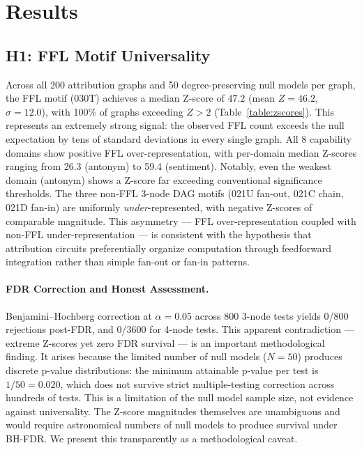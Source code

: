 \section{Results}\label{sec:results}

\subsection{H1: FFL Motif Universality}\label{sec:results_h1}

Across all 200 attribution graphs and 50 degree-preserving null models per graph, the FFL motif (030T) achieves a median Z-score of $47.2$ (mean $Z=46.2$, $\sigma=12.0$), with 100\% of graphs exceeding $Z>2$ (Table~\ref{table:zscores}). This represents an extremely strong signal: the observed FFL count exceeds the null expectation by tens of standard deviations in every single graph. All 8 capability domains show positive FFL over-representation, with per-domain median Z-scores ranging from 26.3 (antonym) to 59.4 (sentiment). Notably, even the weakest domain (antonym) shows a Z-score far exceeding conventional significance thresholds. The three non-FFL 3-node DAG motifs (021U fan-out, 021C chain, 021D fan-in) are uniformly \emph{under}-represented, with negative Z-scores of comparable magnitude. This asymmetry --- FFL over-representation coupled with non-FFL under-representation --- is consistent with the hypothesis that attribution circuits preferentially organize computation through feedforward integration rather than simple fan-out or fan-in patterns.

\paragraph{FDR Correction and Honest Assessment.}
Benjamini--Hochberg correction at $\alpha=0.05$ across 800 3-node tests yields 0/800 rejections post-FDR, and 0/3600 for 4-node tests. This apparent contradiction --- extreme Z-scores yet zero FDR survival --- is an important methodological finding. It arises because the limited number of null models ($N=50$) produces discrete p-value distributions: the minimum attainable p-value per test is $1/50=0.020$, which does not survive strict multiple-testing correction across hundreds of tests. This is a limitation of the null model sample size, not evidence against universality. The Z-score magnitudes themselves are unambiguous and would require astronomical numbers of null models to produce survival under BH-FDR. We present this transparently as a methodological caveat.



